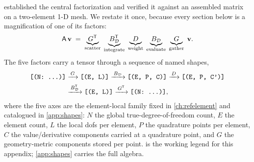  established the central factorization and verified it against
an assembled matrix on a two-element 1-D mesh. We restate it once, because every
section below is a magnification of one of its factors:
\begin{equation}
  \mathsf{A}\,\mathbf{v}
   \;=\;
   \underbrace{G^{\mathsf T}}_{\text{scatter}}\;
   \underbrace{B_{\mathcal{D}}^{\mathsf T}}_{\text{integrate}}\;
   \underbrace{D}_{\text{weight}}\;
   \underbrace{B_{\mathcal{D}}}_{\text{evaluate}}\;
   \underbrace{G}_{\text{gather}}\;
   \mathbf{v} .
  \label{eq:appk-chain}
\end{equation}
The five factors carry a tensor through a sequence of named shapes,
\begin{equation}
\begin{aligned}
  \texttt{[(N: \dots)]}
  &\xrightarrow{\,G\,}
  \texttt{[(E, L)]}
  \xrightarrow{\,B_{\mathcal{D}}\,}
  \texttt{[(E, P, C)]}
  \xrightarrow{\,D\,}
  \texttt{[(E, P, C')]} \\
  &\xrightarrow{\,B_{\mathcal{D}}^{\mathsf T}\,}
  \texttt{[(E, L)]}
  \xrightarrow{\,G^{\mathsf T}\,}
  \texttt{[(N: \dots)]},
\end{aligned}
  \label{eq:appk-shapes}
\end{equation}
where the five axes are the element-local family fixed in \cref{ch:refelement} and
catalogued in \cref{app:shapes}: $N$ the global true-degree-of-freedom count, $E$
the element count, $L$ the local dofs per element, $P$ the quadrature points per
element, $C$ the value/derivative components carried at a quadrature point, and
$G$ the geometry-metric components stored per point.  is the
working legend for this appendix; \cref{app:shapes} carries the full algebra.

